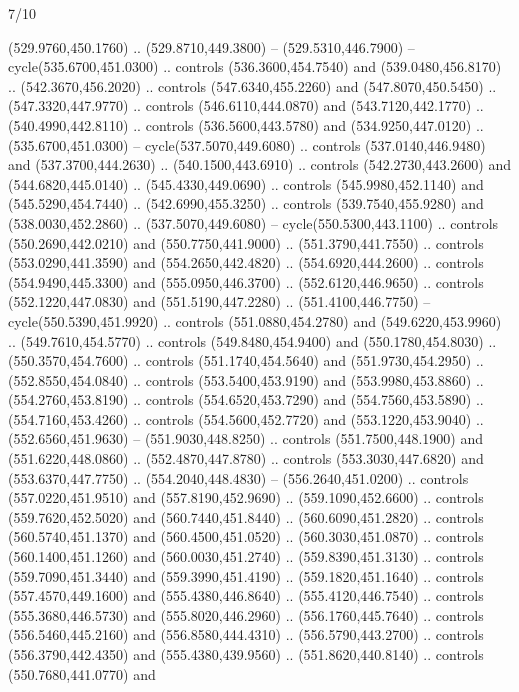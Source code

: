 \begin{flagdescription}{7/10}
\begin{scope}[xshift=0.5\flaglength]
\begin{scope}[scale=0.00185\flagwidth,yshift=245mm,xshift=-43.7mm]
\begin{scope}[y=-0.8pt, x=0.8pt, inner sep=0pt, outer sep=0pt]
\begin{scope}[shift={(-344.0678,183.89831)},fill=brown]
  (529.9760,450.1760) .. (529.8710,449.3800) -- (529.5310,446.7900) --
  cycle(535.6700,451.0300) .. controls (536.3600,454.7540) and
  (539.0480,456.8170) .. (542.3670,456.2020) .. controls (547.6340,455.2260) and
  (547.8070,450.5450) .. (547.3320,447.9770) .. controls (546.6110,444.0870) and
  (543.7120,442.1770) .. (540.4990,442.8110) .. controls (536.5600,443.5780) and
  (534.9250,447.0120) .. (535.6700,451.0300) -- cycle(537.5070,449.6080) ..
  controls (537.0140,446.9480) and (537.3700,444.2630) .. (540.1500,443.6910) ..
  controls (542.2730,443.2600) and (544.6820,445.0140) .. (545.4330,449.0690) ..
  controls (545.9980,452.1140) and (545.5290,454.7440) .. (542.6990,455.3250) ..
  controls (539.7540,455.9280) and (538.0030,452.2860) .. (537.5070,449.6080) --
  cycle(550.5300,443.1100) .. controls (550.2690,442.0210) and
  (550.7750,441.9000) .. (551.3790,441.7550) .. controls (553.0290,441.3590) and
  (554.2650,442.4820) .. (554.6920,444.2600) .. controls (554.9490,445.3300) and
  (555.0950,446.3700) .. (552.6120,446.9650) .. controls (552.1220,447.0830) and
  (551.5190,447.2280) .. (551.4100,446.7750) -- cycle(550.5390,451.9920) ..
  controls (551.0880,454.2780) and (549.6220,453.9960) .. (549.7610,454.5770) ..
  controls (549.8480,454.9400) and (550.1780,454.8030) .. (550.3570,454.7600) ..
  controls (551.1740,454.5640) and (551.9730,454.2950) .. (552.8550,454.0840) ..
  controls (553.5400,453.9190) and (553.9980,453.8860) .. (554.2760,453.8190) ..
  controls (554.6520,453.7290) and (554.7560,453.5890) .. (554.7160,453.4260) ..
  controls (554.5600,452.7720) and (553.1220,453.9040) .. (552.6560,451.9630) --
  (551.9030,448.8250) .. controls (551.7500,448.1900) and (551.6220,448.0860) ..
  (552.4870,447.8780) .. controls (553.3030,447.6820) and (553.6370,447.7750) ..
  (554.2040,448.4830) -- (556.2640,451.0200) .. controls (557.0220,451.9510) and
  (557.8190,452.9690) .. (559.1090,452.6600) .. controls (559.7620,452.5020) and
  (560.7440,451.8440) .. (560.6090,451.2820) .. controls (560.5740,451.1370) and
  (560.4500,451.0520) .. (560.3030,451.0870) .. controls (560.1400,451.1260) and
  (560.0030,451.2740) .. (559.8390,451.3130) .. controls (559.7090,451.3440) and
  (559.3990,451.4190) .. (559.1820,451.1640) .. controls (557.4570,449.1600) and
  (555.4380,446.8640) .. (555.4120,446.7540) .. controls (555.3680,446.5730) and
  (555.8020,446.2960) .. (556.1760,445.7640) .. controls (556.5460,445.2160) and
  (556.8580,444.4310) .. (556.5790,443.2700) .. controls (556.3790,442.4350) and
  (555.4380,439.9560) .. (551.8620,440.8140) .. controls (550.7680,441.0770) and

\end{scope}
\end{scope}
\end{scope}
\end{scope}
\end{flagdescription}
